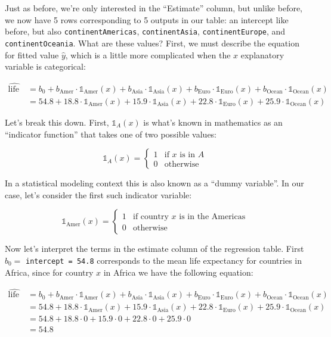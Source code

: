 \documentclass[
  letterpaper,
  DIV=11,
  numbers=noendperiod]{scrreprt}
\theoremstyle{definition}
\theoremstyle{remark}
\begin{document}
Just as before, we're only interested in the ``Estimate'' column, but
unlike before, we now have 5 rows corresponding to 5 outputs in our
table: an intercept like before, but also \texttt{continentAmericas},
\texttt{continentAsia}, \texttt{continentEurope}, and
\texttt{continentOceania}. What are these values? First, we must
describe the equation for fitted value \(\widehat{y}\), which is a
little more complicated when the \(x\) explanatory variable is
categorical:

\[
\begin{aligned}
\widehat{\text{life exp}} &= b_0 + b_{\text{Amer}}\cdot\mathbb{1}_{\mbox{Amer}}(x) + b_{\text{Asia}}\cdot\mathbb{1}_{\mbox{Asia}}(x)
+ b_{\text{Euro}}\cdot\mathbb{1}_{\mbox{Euro}}(x) + b_{\text{Ocean}}\cdot\mathbb{1}_{\mbox{Ocean}}(x)\\
&= 54.8 + 18.8\cdot\mathbb{1}_{\mbox{Amer}}(x) + 15.9\cdot\mathbb{1}_{\mbox{Asia}}(x)
+ 22.8\cdot\mathbb{1}_{\mbox{Euro}}(x) + 25.9\cdot\mathbb{1}_{\mbox{Ocean}}(x)
\end{aligned}
\]

Let's break this down. First, \(\mathbb{1}_{A}(x)\) is what's known in
mathematics as an ``indicator function'' that takes one of two possible
values:

\[
\mathbb{1}_{A}(x) = \left\{
\begin{array}{ll}
1 & \text{if } x \text{ is in } A \\
0 & \text{otherwise} \end{array}
\right.
\]

In a statistical modeling context this is also known as a ``dummy
variable''. In our case, let's consider the first such indicator
variable:

\[
\mathbb{1}_{\mbox{Amer}}(x) = \left\{
\begin{array}{ll}
1 & \text{if } \text{country } x \text{ is in the Americas} \\
0 & \text{otherwise}\end{array}
\right.
\]

Now let's interpret the terms in the estimate column of the regression
table. First \(b_0 =\) \texttt{intercept\ =\ 54.8} corresponds to the
mean life expectancy for countries in Africa, since for country \(x\) in
Africa we have the following equation:

\[
\begin{aligned}
\widehat{\text{life exp}} &= b_0 + b_{\text{Amer}}\cdot\mathbb{1}_{\mbox{Amer}}(x) + b_{\text{Asia}}\cdot\mathbb{1}_{\mbox{Asia}}(x)
+ b_{\text{Euro}}\cdot\mathbb{1}_{\mbox{Euro}}(x) + b_{\text{Ocean}}\cdot\mathbb{1}_{\mbox{Ocean}}(x)\\
&= 54.8 + 18.8\cdot\mathbb{1}_{\mbox{Amer}}(x) + 15.9\cdot\mathbb{1}_{\mbox{Asia}}(x)
+ 22.8\cdot\mathbb{1}_{\mbox{Euro}}(x) + 25.9\cdot\mathbb{1}_{\mbox{Ocean}}(x)\\
&= 54.8 + 18.8\cdot 0 + 15.9\cdot 0 + 22.8\cdot 0 + 25.9\cdot 0\\
&= 54.8
\end{aligned}
\]
\end{document}
